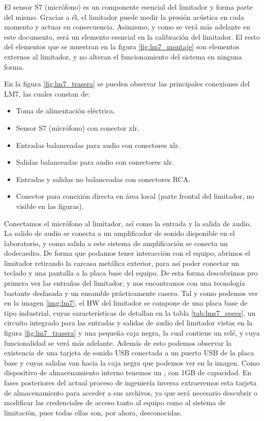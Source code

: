 El sensor S7 (micrófono) es un componente esencial del limitador y forma parte del mismo. Gracias a él, el limitador puede medir la presión acústica en cada momento y actuar en consecuencia. Asimismo, y como se verá más adelante en este documento, será un elemento esencial en la calibración del limitador. El resto del elementos que se muestran en la figura \ref{fig:lm7_montaje} son elementos externos al limitador, y no alteran el funcionamiento del sistema en ninguna forma.

En la figura \ref{fig:lm7_trasera} se pueden observar las principales conexiones del \acrshort{LM7}, las cuales constan de:

\begin{itemize}
    \item Toma de alimentación eléctrica.
    \item Sensor S7 (micrófono) con conector \acrshort{xlr}.
    \item Entradas balanceadas para audio con conectores \acrshort{xlr}.
    \item Salidas balanceadas para audio con conectores \acrshort{xlr}.
    \item Entradas y salidas no balanceadas con conectores \gls{RCA}.
    \item Conector  para conexión directa en área local (parte frontal del limitador, no visible en las figuras).
\end{itemize}

Conectamos el micrófono al limitador, así como la entrada y la salida de audio. La salido de audio se conecta a un amplificador de sonido disponible en el laboratorio, y como salida a este sistema de amplificación se conecta un dodecaedro. De forma que podamos tener interacción con el equipo, abrimos el limitador retirando la carcasa metálica exterior, para así poder conectar un teclado y una pantalla a la placa base del equipo. De esta forma descubrimos pro primera vez las entrañas del limitador, y nos encontramos con una tecnología bastante desfasada y un ensamble prácticamente casero. Tal y como podemos ver en la imagen \ref{img:lm7}, el \gls{HW} del limitador se compone de una placa base de tipo industrial, cuyas características de detallan en la tabla \ref{tab:lms7_specs}, un circuito integrado para las entradas y salidas de audio del limitador vistas en la figura \ref{fig:lm7_trasera} y una pequeña caja negra, la cual contiene un relé, y cuya funcionalidad se verá más adelante. Además de esto podemos observar la existencia de una tarjeta de sonido \acrshort{USB} conectada a un puerto \acrshort{USB} de la placa base y cuyas salidas van hacia la caja negra que podemos ver en la imagen. Como dispositivo de almacenamiento interno tenemos un , con 1GB de capacidad. En fases posteriores del actual proceso de ingeniería inversa extraeremos esta tarjeta de almacenamiento para acceder a sus archivos, ya que será necesario descubrir o modificar las credenciales de acceso tanto al equipo como al sistema de limitación, pues todas ellas son, por ahora, desconocidas.

